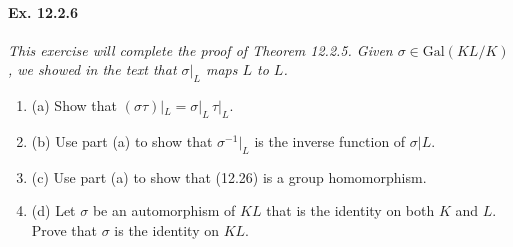 \documentclass[11pt,a4paper]{article}
\newcommand{\be} {\begin{enumerate}}
\newcommand{\ee} {\end{enumerate}}
\newcommand{\Gal}{\mathrm{Gal}}
\begin{document}
\paragraph{Ex. 12.2.6}

{\it This exercise will complete the proof of Theorem 12.2.5. Given $\sigma \in \Gal(KL/K)$, we showed in the text that $\sigma|_L$ maps $L$ to $L$.
\be
\item[(a)] Show that $(\sigma \tau)|_L = \sigma|_L\, \tau|_L$.
\item[(b)] Use part (a) to show that $\sigma^{-1}|_L$ is the inverse function of $\sigma|L$.
\item[(c)] Use part (a) to show that (12.26) is a group homomorphism.
\item[(d)] Let $\sigma$ be an automorphism of $KL$ that is the identity on both $K$ and $L$. Prove that $\sigma$ is the identity on $KL$.
\ee
}
\end{document}
